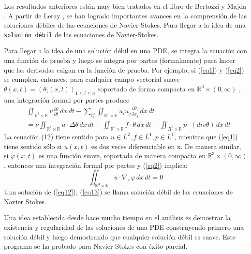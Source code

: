 Los resultados anteriores están muy bien tratados en el libro de Bertozzi y Majda \cite{majda2002vorticity}. A partir de Leray \cite{leray1934mouvement}, se han logrado importantes avances en la comprensión de las soluciones débiles de las ecuaciones de Navier-Stokes. Para llegar a la idea de una \texttt{solución débil} de las ecuaciones de Navier-Stokes.

Para llegar a la idea de una solución débil en una PDE, se integra la ecuación con una función de prueba y luego se integra por partes (formalmente) para hacer que las derivadas caigan en la función de prueba. Por ejemplo, si (\ref{eq1}) y (\ref{eq2}) se cumplen, entonces, para cualquier campo vectorial suave $\theta(x, t) = \left(\theta_i(x, t)\right)_{1\leq i\leq n}$ soportado de forma compacta en $\mathbb{R}^3 \times (0,\infty)$ , una integración formal por partes produce
\begin{equation}
\begin{split}
    &\iint_{\mathbb{R}^3\times \mathbb{R}}u \frac{\partial \theta}{\partial t}\,dx\,dt - \sum_{ij} \iint_{\mathbb{R}^r\times \mathbb{R}}u_i u_j \frac{\partial \theta_i}{\partial x_j} \,dx\,dt\\
    &=\nu \iint_{\mathbb{R}^r\times \mathbb{R}} u \cdot \Delta \theta\,dx\,dt + \iint_{\mathbb{R}^3\times \mathbb{R}} f \cdot \theta \,dx\,dt - \iint_{R^3\times \mathbb{R}}p \cdot \left(div\theta\right)\,dx\,dt
    \label{eq12}
\end{split}
\end{equation}
La ecuación (12) tiene sentido para $u\in L^2, f\in L^1, p\in L^1$, mientras que (\ref{eq1}) tiene sentido sólo si $u(x, t)$ es dos veces diferenciable en x. De manera similar, si $\varphi (x, t)$ es una función suave, soportada de manera compacta en $\mathbb{R}^3 \times (0,\infty)$, entonces una integración formal por partes y (\ref{eq2}) implica:
\begin{equation}
    \iint_{\mathbb{R}^3\times \mathbb{R}} u \cdot \nabla_x \varphi \,dx\,dt = 0
    \label{eq13}
\end{equation}
Una solución de (\ref{eq12}), (\ref{eq13}) se llama solución débil de las ecuaciones de Navier Stokes.

Una idea establecida desde hace mucho tiempo en el análisis es demostrar la existencia y regularidad de las soluciones de una PDE construyendo primero una solución débil y luego demostrando que cualquier solución débil es suave. Este programa se ha probado para Navier-Stokes con éxito parcial.

